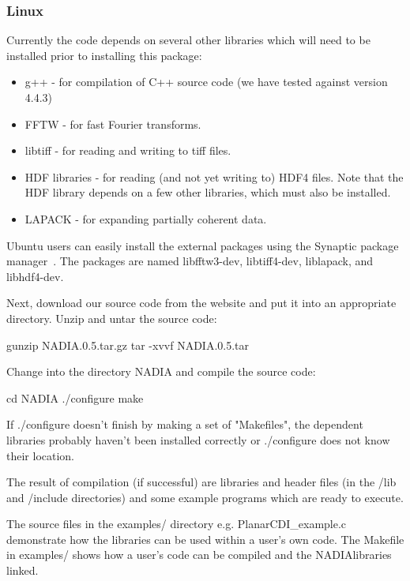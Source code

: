 \documentclass[]{nadia}
\def\name{NADIA}
\begin{document}
\subsubsection{Linux}

Currently the code depends on several other libraries which will need to
be installed prior to installing this package:
\begin{itemize}
\item g++\cite{g++} - for compilation of C++ source code (we have tested against version 4.4.3)
\item FFTW\cite{FFTW05} - for fast Fourier transforms.
\item libtiff\cite{libtiff} - for reading and writing to tiff files.
\item HDF libraries\cite{hdf} - for reading (and not yet writing to) HDF4
  files. Note that the HDF library depends on a few other libraries,
  which must also be installed.
\item LAPACK\cite{lapack} - for expanding partially coherent data.
\end{itemize}

Ubuntu users can easily install the external packages using the
Synaptic package manager~\cite{synaptic}. The packages are named libfftw3-dev,
libtiff4-dev, liblapack, and libhdf4-dev.

Next, download our source code from the website and put it into an
appropriate directory. Unzip and untar the source code:
\begin{myverbatim}
  gunzip NADIA.0.5.tar.gz 
  tar -xvvf NADIA.0.5.tar
\end{myverbatim}

Change into the directory NADIA and compile the source code: 
\begin{myverbatim}
  cd NADIA
  ./configure 
  make
\end{myverbatim}

If ./configure doesn't finish by making a set of "Makefiles", the
dependent libraries probably haven't been installed correctly or
./configure does not know their location.

The result of compilation (if successful) are libraries and header
files (in the /lib and /include directories) and some example programs
which are ready to execute.

The source files in the examples/ directory e.g. PlanarCDI\_example.c
demonstrate how the libraries can be used within a user's own
code. The Makefile in examples/ shows how a user's code can be
compiled and the \name libraries linked.
\end{document}
